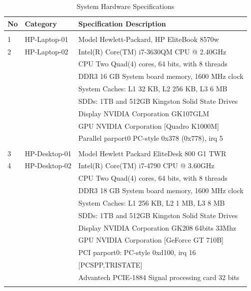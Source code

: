 \begin{table}[ht]
\caption{System Hardware Specifications}
\label{chap3-System Hardware Specifications}
\begin{tabular}{p{0.5cm} p{4.30cm} p{9.2cm} }
\hline	
\textbf{No} & \textbf{Category}   &    \textbf{Specification Description}\\
\hline
	&                       &    \\
1   &   HP-Laptop-01        & Model Hewlett-Packard, HP EliteBook 8570w \\
2	&   HP-Laptop-02        & Intel(R) Core(TM) i7-3630QM CPU @ 2.40GHz \\
	&                       & CPU Two Quad(4) cores, 64 bits, with 8 threads\\
	&                       & DDR3 16 GB System board memory, 1600 MHz clock\\
	&                       & System Caches: L1 32 KB, L2 256 KB, L3 6 MB\\
	&                       & SDDs: 1TB and 512GB Kingston Solid State Drives\\ 
	&                       & Display NVIDIA Corporation GK107GLM \\ 		
	&                       & GPU NVIDIA Corporation [Quadro K1000M]\\ 		
	&                       & Parallel parport0 PC-style 0x378 (0x778), irq 5\\
	&                       &    \\  
3   &	HP-Desktop-01       & Model Hewlett Packard EliteDesk 800 G1 TWR   \\
4   &	HP-Desktop-02       & Intel(R) Core(TM) i7-4790 CPU @ 3.60GHz \\  
	&                       & CPU Two Quad(4) cores, 64 bits, with 8 threads\\
	&                       & DDR3 18 GB System board memory, 1600 MHz clock\\
	&                       & System Caches: L1 256 KB, L2 1 MB, L3 8 MB\\
	&                       & SDDs: 1TB and 512GB Kingston Solid State Drives\\
	&                       & Display NVIDIA Corporation GK208 64bits 33Mhz\\ 
	&                       & GPU NVIDIA Corporation [GeForce GT 710B]\\         
	&                       & PCI parport0: PC-style 0xd100, irq 16 \\
	&                       & [PCSPP,TRISTATE]\\
	&                       & Advantech PCIE-1884 Signal processing card 32 bits\\
    &                       & \\
\hline
\end{tabular}

\end{table}



